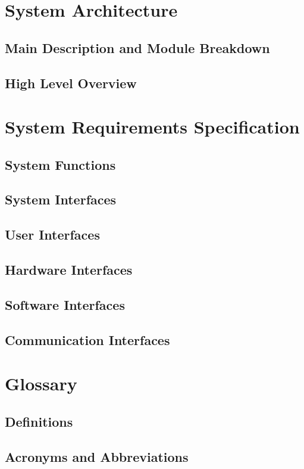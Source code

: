 \documentclass{article}
\begin{document}
\section{System Architecture}
\subsection{Main Description and Module Breakdown}
\subsection{High Level Overview}

\section{System Requirements Specification}
\subsection{System Functions}
\subsection{System Interfaces}
\subsection{User Interfaces}
\subsection{Hardware Interfaces}
\subsection{Software Interfaces}
\subsection{Communication Interfaces}

\section{Glossary}
\subsection{Definitions}
\subsection{Acronyms and Abbreviations}
\end{document}
